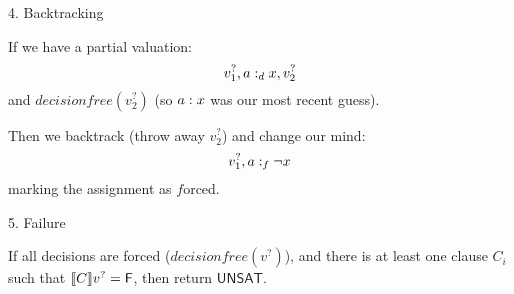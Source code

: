 \documentclass[xetex,aspectratio=169,14pt,hyperref={pdfpagelabels=true,pdflang={en-GB}}]{beamer}
\begin{document}
\begin{frame}
  {4. Backtracking}

  If we have a partial valuation:
  \begin{displaymath}
    v_1^?, a :_d x, v_2^?
  \end{displaymath}
  and $\mathit{decisionfree}(v_2^?)$ (so $a : x$ was our most recent guess).

  \medskip

  Then we backtrack (throw away $v_2^?$) and change our mind:
  \begin{displaymath}
    v_1^?, a :_f \lnot x
  \end{displaymath}
  marking the assignment as $f$orced.

\end{frame}

\begin{frame}
  {5. Failure}

  If all decisions are forced ($\mathit{decisionfree}(v^?)$), and
  there is at least one clause $C_i$ such that $\llbracket C \rrbracket v^? = \mathsf{F}$,
  then return $\mathsf{UNSAT}$.

\end{frame}
\end{document}
